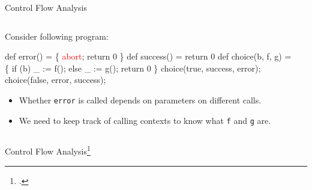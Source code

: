 \begin{frame}[fragile]{Control Flow Analysis}
  \footnotesize
  \begin{columns}
    \begin{column}{0.5\textwidth}
    Consider following program:\vspace{-1em}
  \begin{semiverbatim}\footnotesize
def error() = \{ \textcolor{red}{abort}; return 0 \}
def success() = return 0
def choice(b, f, g) = \{
  if (b) _ := \alert<3>{f}();
  else   _ := \alert<3>{g}();
  return 0
\}
choice(true, success, error);
choice(false, error, success);
\end{semiverbatim}\vspace{-2em}
\begin{itemize}
\item<3-> Whether \texttt{error} is called depends on parameters on different calls.
\item<4-> We need to keep track of calling contexts to know what \texttt{f} and \texttt{g} are.
\end{itemize}
\end{column}
\begin{column}{0.5\textwidth}
\end{column}
\end{columns}
\end{frame}

\begin{frame}{Control Flow Analysis\footcite{shivers1991control}}
\end{frame}

